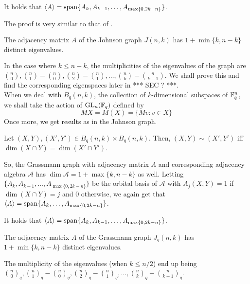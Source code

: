 	\begin{fprop}
		\label{prop: johnson-adj-eigenvals}
		It holds that $\langle A\rangle = \operatorname{span}\{A_k,A_{k-1},\ldots,A_{\max\{0,2k-n\}}\}$.
	\end{fprop}
	The proof is very similar to that of .

	\begin{fcor}
		The adjacency matrix $A$ of the Johnson graph $J(n,k)$ has $1+\min\{k,n-k\}$ distinct eigenvalues.
	\end{fcor}
	In the case where $k \le n-k$, the multiplicities of the eigenvalues of the graph are $\binom{n}{0}, \binom{n}{1} - \binom{n}{0}, \binom{n}{2} - \binom{n}{1}, \ldots, \binom{n}{k}-\binom{n}{k-1}$. We shall prove this and find the corresponding eigenspaces later in *** SEC ? ***.\\

	When we deal with $B_q(n,k)$, the collection of $k$-dimensional subspaces of $\mathbb{F}_q^n$, we shall take the action of $\operatorname{GL}_n(\mathbb{F}_q)$ defined by
	\[ MX = M(X) = \{Mv : v \in X\} \]
	Once more, we get results as in the Johnson graph.

	\begin{flem}
		Let $(X,Y), (X',Y') \in B_q(n,k) \times B_q(n,k)$. Then, $(X,Y) \sim (X',Y')$ iff $\dim(X \cap Y) = \dim(X' \cap Y')$.
	\end{flem}
	So, the Grassmann graph with adjacency matrix $A$ and corresponding adjacency algebra $\mathcal{A}$ has $\dim \mathcal{A} = 1+\max\{k,n-k\}$ as well. Letting $\{A_k,A_{k-1},\ldots,A_{\max\{0,2k-n\}}\}$ be the orbital basis of $\mathcal{A}$ with $A_j(X,Y) = 1$ if $\dim(X \cap Y) = j$ and $0$ otherwise, we again get that $\langle A\rangle = \operatorname{span}\{A_k,\ldots,A_{\max\{0,2k-n\}}\}$.

	\begin{fprop}
		\label{prop: johnson-adj-eigenvals}
		It holds that $\langle A\rangle = \operatorname{span}\{A_k,A_{k-1},\ldots,A_{\max\{0,2k-n\}}\}$.
	\end{fprop}

	\begin{fcor}
	 	The adjacency matrix $A$ of the Grassmann graph $J_q(n,k)$ has $1+\min\{k,n-k\}$ distinct eigenvalues. 
	 \end{fcor}
	 
	 The multiplicity of the eigenvalues (when $k \le n/2$) end up being $\binom{n}{0}_q, \binom{n}{1}_q-\binom{n}{0}_q, \binom{n}{2}_q-\binom{n}{1}_q, \ldots, \binom{n}{k}_q-\binom{n}{k-1}_q$.\\

